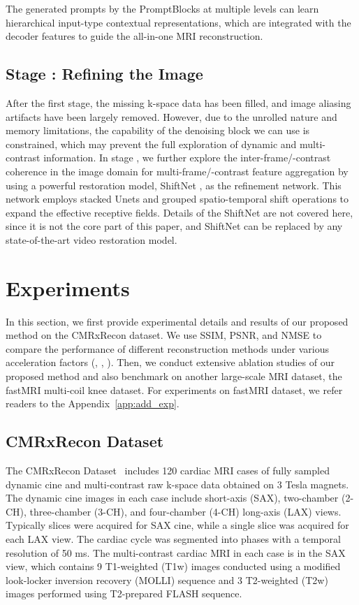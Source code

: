\documentclass[runningheads]{llncs}
\newcommand{\RNum}[1]{\uppercase\expandafter{\romannumeral #1\relax}}
\begin{document}
The generated prompts by the PromptBlocks at multiple levels can learn hierarchical input-type contextual representations, which are integrated with the decoder features to guide the all-in-one MRI reconstruction.



\subsection{Stage \RNum{2}: Refining the Image}
After the first stage, the missing k-space data has been filled, and image aliasing artifacts have been largely removed. However, due to the unrolled nature and memory limitations, the capability of the denoising block we can use is constrained, which may prevent the full exploration of dynamic and multi-contrast information. In stage \RNum{2}, we further explore the inter-frame/-contrast coherence in the image domain for multi-frame/-contrast feature aggregation by using a powerful restoration model, ShiftNet \cite{li2023simple}, as the refinement network. This network employs stacked Unets and grouped spatio-temporal shift operations to expand the effective receptive fields. Details of the ShiftNet are not covered here, since it is not the core part of this paper, and ShiftNet can be replaced by any state-of-the-art video restoration model. 
\section{Experiments}
In this section, we first provide experimental details and results of our proposed method on the CMRxRecon dataset.
We use SSIM, PSNR, and NMSE to compare the performance of different reconstruction methods under various acceleration factors (, , ). Then, we conduct extensive ablation studies of our proposed method and also benchmark on another large-scale MRI dataset, the fastMRI multi-coil knee dataset. For experiments on fastMRI dataset, we refer readers to the Appendix~\ref{app:add_exp}.

\subsection{CMRxRecon Dataset}
The CMRxRecon Dataset~\cite{wang2023cmrxrecon} includes 120 cardiac MRI cases of fully sampled dynamic cine and multi-contrast raw k-space data obtained on 3 Tesla magnets. The dynamic cine images in each case include short-axis (SAX), two-chamber (2-CH), three-chamber (3-CH), and four-chamber (4-CH) long-axis (LAX) views. Typically  slices were acquired for SAX cine, while a single slice was acquired for each LAX view. The cardiac cycle was segmented into  phases with a temporal resolution of 50 ms. The multi-contrast cardiac MRI in each case is in the SAX view, which contains 9 T1-weighted (T1w) images conducted using a modified look-locker inversion recovery (MOLLI) sequence and 3 T2-weighted (T2w) images performed using T2-prepared FLASH sequence. 
\end{document}

